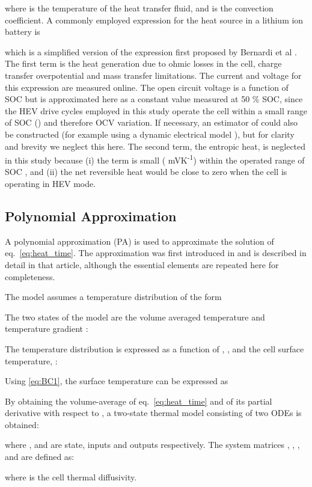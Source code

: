 \documentclass[journal, english]{IEEEtran}
\begin{document}
where  is the temperature of the heat transfer fluid, and  is the convection coefficient.
A commonly employed expression for the heat source in a lithium ion
battery is

which is a simplified version of the expression first proposed by
Bernardi et al \cite{Bernardi1985}. The first term is the heat generation due to ohmic losses in the cell, charge transfer overpotential and
mass transfer limitations. The current  and voltage  for this expression are measured online. The open circuit voltage
 is a function of SOC but is approximated here as a constant value measured at 50 \% SOC, since the HEV drive cycles employed in
this study operate the cell within a small range of SOC () and therefore OCV variation.
If necessary, an estimator of  could also be constructed (for example using a dynamic electrical model \cite{Birkl2013a}), but for clarity and brevity we neglect this here.
The second term, the entropic
heat, is neglected in this study because (i) the term 
is small ( mVK\textsuperscript{-1}) within the operated range of SOC \cite{Forgez2010a}, and (ii) the net reversible heat would be close to zero when the cell
is operating in HEV mode.
\subsection{Polynomial Approximation}
A polynomial approximation (PA) is used to approximate the solution of eq.\ \ref{eq:heat_time}. The approximation was first introduced in  \cite{Kim2013} and is described in detail in that article, although the essential elements are repeated
here for completeness.

The model assumes a temperature distribution of the form

The two states of the model are the volume averaged temperature  and
temperature gradient :

The temperature distribution is expressed as a function of , , and the cell surface temperature, :


Using \ref{eq:BC1}, the surface temperature can be expressed as


By obtaining the volume-average of eq.\
\ref{eq:heat_time} and of its partial derivative with respect to
, a two-state thermal model consisting of two ODEs is obtained:


where ,
 and 
are state, inputs and outputs respectively. The system matrices ,
, , and  are defined as:

where  is the cell thermal diffusivity.
\end{document}
